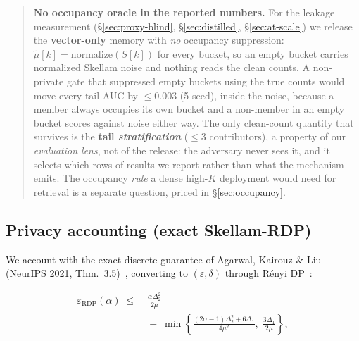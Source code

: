 \documentclass[pdflatex,sn-mathphys-num,12pt]{sn-jnl}
\theoremstyle{thmstyleone}%
\theoremstyle{thmstyletwo}%
\theoremstyle{thmstylethree}%
\newcommand{\eps}{\varepsilon}
\newcommand{\secref}[1]{\S\ref{#1}}
\begin{document}
\begin{quote}
\textbf{No occupancy oracle in the reported numbers.} For the leakage measurement
(\secref{sec:proxy-blind}, \secref{sec:distilled}, \secref{sec:at-scale}) we release
the \textbf{vector-only} memory with \emph{no} occupancy suppression:
$\tilde\mu[k] = \mathrm{normalize}(S[k])$ for every bucket, so an empty bucket carries
normalized Skellam noise and nothing reads the clean counts. A non-private gate that
suppressed empty buckets using the true counts would move every tail-AUC by
$\leq 0.003$ (5-seed), inside the noise, because a member always occupies its own
bucket and a non-member in an empty bucket scores against noise either way. The only
clean-count quantity that survives is the \textbf{tail \emph{stratification}}
($\leq 3$ contributors), a property of our \emph{evaluation lens}, not of the release:
the adversary never sees it, and it selects which rows of results we report rather
than what the mechanism emits. The
occupancy \emph{rule} a dense high-$K$ deployment would need for retrieval is a
separate question, priced in \secref{sec:occupancy}.
\end{quote}

\subsection{Privacy accounting (exact Skellam-RDP)}\label{sec:accounting}

We account with the exact discrete guarantee of Agarwal, Kairouz \& Liu (NeurIPS
2021, Thm.~3.5)~\cite{agarwal2021skellam}, converting to $(\eps,\delta)$ through
R\'enyi DP~\cite{mironov2017rdp}:

\begin{equation}\label{eq:skellam-rdp}
\begin{split}
  \eps_{\mathrm{RDP}}(\alpha) \;\leq\;
  &\frac{\alpha \Delta_2^2}{2\mu} \\[2pt]
  &{}+\; \min\!\left\{
    \frac{(2\alpha - 1)\Delta_2^2 + 6\Delta_1}{4\mu^2},\;
    \frac{3\Delta_1}{2\mu}
  \right\},
\end{split}
\end{equation}
\end{document}
